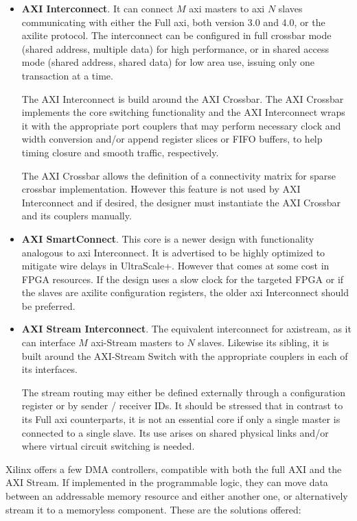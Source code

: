 \begin{itemize}
\item	\textbf{AXI Interconnect}.
	It can connect $M$ \gls{axi} masters to \gls{axi} $N$ slaves 
	communicating with either the Full \gls{axi},
	both version 3.0 and 4.0, or the \gls{axilite} protocol.
	The interconnect can be configured in full crossbar mode 
	(shared address, multiple data) for high performance,
	or in shared access mode (shared address, shared data) 
	for low area use, issuing only one transaction at a time.
	
	The AXI Interconnect is build around the AXI Crossbar. 
	The AXI Crossbar implements the core switching functionality 
	and the AXI Interconnect wraps it with the appropriate port couplers that may
	perform necessary clock and width conversion and/or append register slices or FIFO buffers,
	to help timing closure and smooth traffic, respectively.

	The AXI Crossbar allows the definition of a connectivity matrix 
	for sparse crossbar implementation. 
	However this feature is not used by AXI Interconnect and if desired,
	the designer must instantiate the AXI Crossbar and its couplers manually.

\item	\textbf{AXI SmartConnect}. 
	This core is a newer design with functionality analogous to \gls{axi} Interconnect.
	It is advertised to be highly optimized to mitigate wire delays in UltraScale+.
	However that comes at some cost in FPGA resources.
	If the design uses a slow clock for the targeted FPGA or 
	if the slaves are \gls{axilite} configuration registers,
	the older \gls{axi} Interconnect should be preferred.

\item	\textbf{AXI Stream Interconnect}. 
	The equivalent interconnect for \gls{axistream}, 
	as it can interface $M$ \gls{axi}-Stream masters to $N$ slaves.
	Likewise its sibling, it is built around the AXI-Stream Switch with the appropriate
	couplers in each of its interfaces.

	The stream routing may either be defined externally through 
	a configuration register or by sender / receiver IDs. 
	It should be stressed that in contrast to its Full \gls{axi} counterparts, 
	it is not an essential core if only a single master is connected to a single slave.
	Its use arises on shared physical links and/or where virtual circuit switching is needed.
\end{itemize}

Xilinx offers a few DMA controllers, compatible with both the full AXI and the AXI Stream.
If implemented in the programmable logic, they can move data between an
addressable memory resource and either another one, or alternatively stream it
to a memoryless component. These are the solutions offered:


